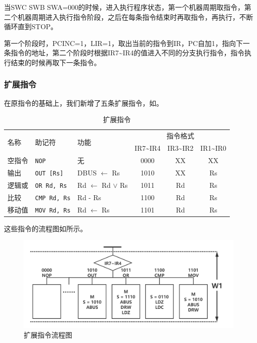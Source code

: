 \documentclass[lang=cn,11pt,a4paper,cite=authornum]{paper}
\begin{document}
当SWC SWB SWA=000的时候，进入执行程序状态，第一个机器周期取指令，第二个机器周期进入执行指令阶段，之后在每条指令结束时再取指令，再执行，不断循环直到STOP。

第一个阶段时，PCINC=1，LIR=1，取出当前的指令到IR，PC自加1，指向下一条指令的地址，第二个阶段时根据IR7\textasciitilde IR4的值进入不同的分支执行指令，指令执行结束的时候再取下一条指令。

\subsubsection{扩展指令}

在原指令的基础上，我们新增了五条扩展指令，如。

\begin{table}[!htbp]
    \centering
    \caption{扩展指令\label{tab:extendedcommand}}
    \begin{tabular}{|l|l|l|c|c|c|}
        \hline
        \multirow{2}{*}{名称} & \multirow{2}{*}{助记符} & \multirow{2}{*}{功能} & \multicolumn{3}{c|}{指令格式} \\ \cline{4-6}
        & & & IR7\textasciitilde IR4 & IR3\textasciitilde IR2 & IR1\textasciitilde IR0 \\ \hline
        空指令 & \texttt{NOP} & 无 & 0000 & XX & XX \\ \hline
        输出 & \texttt{OUT [Rs]} & DBUS $\leftarrow$ Rs & 1010 & XX & Rs \\ \hline
        逻辑或 & \texttt{OR Rd, Rs} & Rd $\leftarrow$ Rd $\vee$ Rs & 1011 & Rd & Rs \\ \hline
        比较 & \texttt{CMP Rd, Rs} & Rd - Rs & 1100 & Rd & Rs \\ \hline
        移动值 & \texttt{MOV Rd, Rs} & Rd $\leftarrow$ Rs & 1101 & Rd & Rs \\ \hline
    \end{tabular}
\end{table}

这些指令的流程图如所示。

\begin{figure}[htbp]
    \centering
    \includegraphics[width=0.8\linewidth]{./Images/extended-ins.png}
    \caption{扩展指令流程图\label{fig:extended-ins}}
\end{figure}
\end{document}
